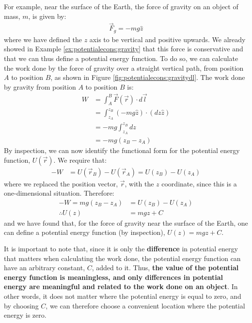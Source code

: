 For example, near the surface of the Earth, the force of gravity on an object of mass, $m$, is given by:
\begin{align*}
\vec F_g = -mg \hat z
\end{align*}
where we have defined the $z$ axis to be vertical and positive upwards. We already showed in Example \ref{ex:potentialecons:gravity} that this force is conservative and that we can thus define a potential energy function. To do so, we can calculate the work done by the force of gravity over a straight vertical path, from position $A$ to position $B$, as shown in Figure \ref{fig:potentialecons:gravitydl}.
The work done by gravity from position $A$ to position $B$ is:
\begin{align*}
W &= \int_A^B \vec F(\vec r) \cdot d\vec l\\
&= \int_{z_A}^{z_B} ( -mg \hat z) \cdot (dz \hat z) \\
&= -mg \int_{z_A}^{z_B} dz\\
&= -mg(z_B-z_A) 
\end{align*} 
By inspection, we can now identify the functional form for the potential energy function, $U(\vec r)$. We require that:
\begin{align*}
-W &= U(\vec r_B) - U(\vec r_A) = U(z_B) - U(z_A)
\end{align*}
where we replaced the position vector, $\vec r$, with the $z$ coordinate, since this is a one-dimensional situation. Therefore:
\begin{align*}
-W=mg(z_B-z_A)&= U(z_B) - U(z_A)\\
\therefore U(z) &= mgz + C
\end{align*} 
and we have found that, for the force of gravity near the surface of the Earth, one can define a potential energy function (by inspection), $U(z) = mgz +C$.

It is important to note that, since it is only the \textbf{difference} in potential energy that matters when calculating the work done, the potential energy function can have an arbitrary constant, $C$, added to it. Thus, \textbf{the value of the potential energy function is meaningless, and only differences in potential energy are meaningful and related to the work done on an object}. In other words, it does not matter where the potential energy is equal to zero, and by choosing $C$, we can therefore choose a convenient location where the potential energy is zero.

